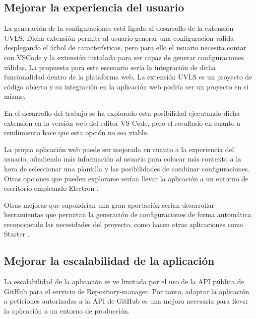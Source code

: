 \documentclass[12pt, a4paper, twoside]{article}
\begin{document}
\subsection{Mejorar la experiencia del usuario }
La generación de la configuraciones está ligada al desarrollo de la extensión UVLS. Dicha extensión permite al usuario generar una configuración válida desplegando el árbol de características, pero para ello el usuario
necesita contar con VSCode y la extensión instalada para ser capaz de generar configuraciones válidas. La propuesta para este escenario sería la integración de dicha funcionalidad dentro de la plataforma web,
La extensión UVLS es un proyecto de código abierto y su integración en la aplicación web podría ser un proyecto en sí mismo. 

En el desarrollo del trabajo se ha explorado esta posibilidad ejecutando dicha extensión en la versión web del editor VS Code, pero el resultado en cuanto a rendimiento hace que esta opción no sea viable.

La propia aplicación web puede ser mejorada en cuanto a la experiencia del usuario, añadiendo más información al usuario para colocar más contexto a la hora de seleccionar una plantilla y las posibilidades de combinar configuraciones. 
Otras opciones que pueden explorarse serían llevar la aplicación a un entorno de escritorio empleando Electron \cite{electron}.

Otras mejoras que supondrían una gran aportación serían desarrollar herramientas que permitan la generación de configuraciones de forma automática reconociendo las necesidades del proyecto, como hacen otras aplicaciones como Starter \cite{starter}.

\subsection{Mejorar la escalabilidad de la aplicación}
La escalabilidad de la aplicación se ve limitada por el uso de la API pública de GitHub para el servicio de Repository-manager.
Por tanto, adaptar la aplicación a peticiones autorizadas a la API de GitHub es una mejora necesaria para llevar la aplicación a un entorno de producción.
\end{document}
